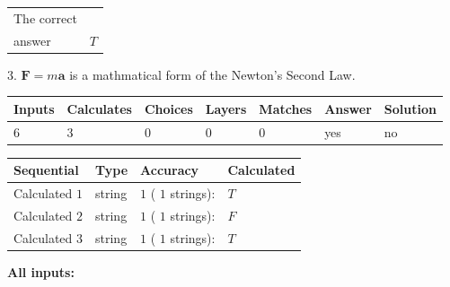 \documentclass[12pt]{article}
\begin{document}
\noindent\begin{tabular}{|l|l|}\hline The correct & \\
          answer &  %
$T$ \\ \hline \end{tabular}
3.  %
$\mathbf{F}=m\mathbf{a}$ is a mathmatical form of  %
the Newton's Second Law.
 
 
 
\noindent{}
 
 

 
\vspace{0.3in}
   
   
   
   
\noindent\begin{tabular}{|l|l|l|l|l|l|l|}
 \hline
Inputs & Calculates & Choices & Layers & Matches & Answer & Solution \\ \hline
           6  & 
           3  & 
           0
  & 
           0  & 
           0  & 
  yes & 
  no 
  \\ \hline
 \end{tabular}
   
   
   
   
\noindent{}
   
   
  
  
\noindent\begin{tabular}{|l|l|l|l|}
\hline
 Sequential & Type & Accuracy & Calculated \\ 
\hline
 
 
  Calculated $            1 $ & string & $            1  $ ( $           1  $ strings): 
 & $T$
 \\  \hline  
 
 
  Calculated $            2 $ & string & $            1  $ ( $           1  $ strings): 
 & $F$
 \\  \hline  
 
 
  Calculated $            3 $ & string & $            1  $ ( $           1  $ strings): 
 & $T$
 \\  \hline  
 \end{tabular}
   
   
   
   
\noindent\vspace{0.1in}\hspace{-0.08in} {\textbf{\Large{All inputs: }}}
   
\end{document}
